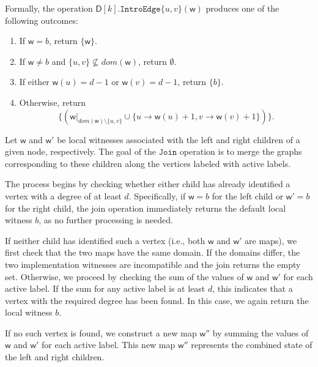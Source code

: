 \documentclass[11pt,a4paper]{article}
\newcommand{\treewidthvalue}{k}
\newcommand{\introedgegeneric}[2]{\mathtt{IntroEdge}\{#1,#2\}}
\newcommand{\joingenericcore}{\mathtt{Join}}
\newcommand{\vertexone}{u}
\newcommand{\vertextwo}{v}
\newcommand{\awitness}{\mathsf{w}}
\newcommand{\dpcore}{\mathsf{D}}
\newcommand{\domain}{dom}
\newcommand{\maxdegreeparameter}{d}
\newcommand{\maxdegreefound}{b}
\begin{document}
{Formally, the operation $\dpcore[\treewidthvalue].\introedgegeneric{\vertexone}{\vertextwo}(\awitness)$ produces one of the following outcomes:

\begin{enumerate}
    \item If $\awitness=\maxdegreefound$, return $\{\awitness\}$.
    \item If $\awitness\neq\maxdegreefound$ and $\{\vertexone,\vertextwo\}\nsubseteq \domain(\awitness)$, return $\emptyset$.
    \item If either $\awitness(\vertexone)=\maxdegreeparameter-1$ or $\awitness(\vertextwo)=\maxdegreeparameter-1$, return $\{\maxdegreefound\}$.
    \item Otherwise, return
    \[
    \{(\awitness|_{\domain(\awitness)\setminus\{\vertexone,\vertextwo\}}\cup\{\vertexone\to \awitness(\vertexone)+1,\vertextwo\to\awitness(\vertextwo)+1\})\}.
    \]
\end{enumerate}

Let $\awitness$ and $\awitness'$ be local witnesses associated with the left and right children of a given node, respectively. The goal of the $\joingenericcore$ operation is to merge the graphs corresponding to these children along the vertices labeled with active labels.

The process begins by checking whether either child has already identified a vertex with a degree of at least $\maxdegreeparameter$. Specifically, if $\awitness = \maxdegreefound$ for the left child or $\awitness' = \maxdegreefound$ for the right child, the join operation immediately returns the default local witness $\maxdegreefound$, as no further processing is needed.

If neither child has identified such a vertex (i.e., both $\awitness$ and $\awitness'$ are maps), we first check that the two maps have the same domain. If the domains differ, the two implementation witnesses are incompatible and the join returns the empty set. Otherwise, we proceed by checking the sum of the values of $\awitness$ and $\awitness'$ for each active label. If the sum for any active label is at least $\maxdegreeparameter$, this indicates that a vertex with the required degree has been found. In this case, we again return the local witness $\maxdegreefound$.

If no such vertex is found, we construct a new map $\awitness''$ by summing the values of $\awitness$ and $\awitness'$ for each active label. This new map $\awitness''$ represents the combined state of the left and right children.

}
\end{document}
